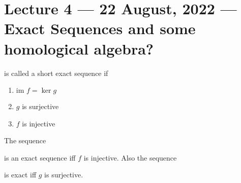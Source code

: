 \section{Lecture 4 --- 22 August, 2022 --- Exact Sequences and some homological algebra?}
\begin{definition}
    is called a short exact sequence if 
    \begin{enumerate}
	\item $\text{im } f = \ker g$
	\item $g$ is surjective
	\item $f$ is injective
    \end{enumerate}
    \label{def:short-exact-sequence}
\end{definition}

\begin{remark}
    The sequence
    is an exact sequence iff $f$ is injective. Also the sequence 
    is exact iff $g$ is surjective.
    \label{rem:exact-inj-sur}
\end{remark}


